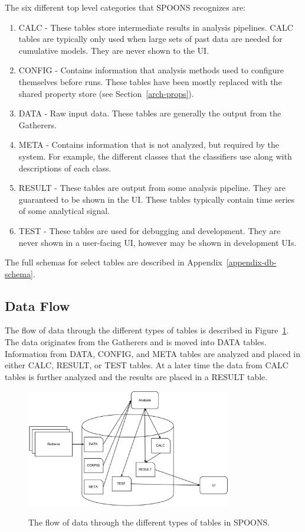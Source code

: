 \documentclass[12pt]{ucthesis}
\newcommand{\captionfonts}{\small\bf\ssp}
\begin{document}
The six different top level categories that SPOONS recognizes are:

\begin{enumerate}
   \item CALC - These tables store intermediate results in analysis pipelines. CALC tables are typically only used when large sets of past data are needed for cumulative models. They are never shown to the UI.
   \item CONFIG - Contains information that analysis methods used to configure themselves before runs. These tables have been mostly replaced with the shared property store (see Section~\ref{arch-props}).
   \item DATA - Raw input data. These tables are generally the output from the Gatherers.
   \item META - Contains information that is not analyzed, but required by the system. For example, the different classes that the classifiers use along with descriptions of each class.
   \item RESULT - These tables are output from some analysis pipeline. They are guaranteed to be shown in the UI. These tables typically contain time series of some analytical signal.
   \item TEST - These tables are used for debugging and development. They are never shown in a user-facing UI, however may be shown in development UIs.
\end{enumerate}

The full schemas for select tables are described in Appendix~\ref{appendix-db-schema}.

\subsection{Data Flow}
\label{arch-database-data-flow}
The flow of data through the different types of tables is described in Figure~\ref{fig:db-data-flow}.
The data originates from the Gatherers and is moved into DATA tables. Information from
DATA, CONFIG, and META tables are analyzed and placed in either CALC, RESULT, or TEST tables.
At a later time the data from CALC tables is further analyzed and the results are placed in a RESULT table.

\begin{figure}
   \begin{center}
      \includegraphics[width=0.8\textwidth]{images/DB_Data_Flow.eps}
      \captionfonts
      \caption[Database Data Flow]{The flow of data through the different types of tables in SPOONS.}
      \label{fig:db-data-flow}
   \end{center}
\end{figure}
\end{document}
